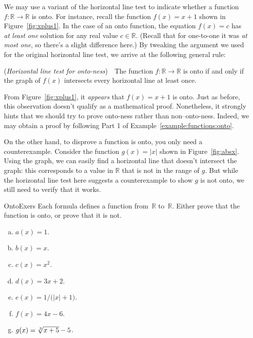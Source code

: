 \begin{rem}
We may use a variant of the horizontal line test to indicate whether a function $f:\mathbb{R} \rightarrow \mathbb{R}$ is onto.  
For instance, recall the function $f(x)=x +1$ shown in Figure~\ref{fig:xplus1}. In the case of an onto function, the equation $f(x)=c$ has \emph{at least one} solution for any real value $c \in \mathbb{R}$.  (Recall that for one-to-one it was \emph{at most one}, so there's a slight difference here.) By tweaking the argument we used for the original horizontal line test, we arrive at the following general rule:
\bigskip

\noindent 
(\emph{Horizontal line test for onto-ness})~~The function $f:\mathbb{R} \rightarrow \mathbb{R}$ is onto if and only if the graph of $f(x)$ intersects every horizontal line at least once.
\bigskip

From Figure~\ref{fig:xplus1}, it \emph{appears} that $f(x)=x+1$ is onto. Just as before, this observation doesn't qualify as a mathematical proof. Nonetheless, it strongly hints that we should try to prove onto-ness rather than non--onto-ness. Indeed, we may obtain a proof by following Part 1 of Example~\ref{example:functions:onto}.

On the other hand, to disprove a function is onto, you only need a counterexample.  Consider the function $g(x)= |x|$ shown in Figure~\ref{fig:absx}. Using the graph, we can easily find a horizontal line that doesn't intersect the graph: this corresponds to a value in $\mathbb{R}$ that is not in the range of $g$.  But while the horizontal line test here suggests a counterexample to show $g$ is not onto, we still need to verify that it works.
\end{rem}    

  
\begin{exercise}{OntoExers} 
Each formula defines a function from~$\mathbb{R}$ to~$\mathbb{R}$. Either prove that the function is onto, or prove that it is not.
\begin{multicols}{2}
\begin{enumerate}[(a)]
\item \label{OntoExers-formula-a(x)}
 $a(x) = 1$.
\item \label{OntoExers-formula-b(x)}
 $b(x) = x$.
\item \label{OntoExers-formula-c(x)}
 $c(x) = x^2$.
\item \label{OntoExers-formula-d(x)}
 $d(x) = 3x + 2$.
\item \label{OntoExers-formula-e(x)}
 $e(x) = 1/ \bigl( |x| + 1 \bigr)$.
\item \label{OntoExers-formula-f(x)}
 $f(x) = 4x - 6$.
\item \label{OntoExers-formula-g(x)}
 $g(x) = \root 3 \of {x+5} - 5$.
\end{enumerate}
\end{multicols}
\end{exercise}


